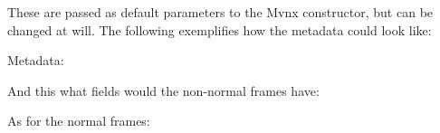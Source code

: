 \documentclass[letterpaper,10pt,english,openany,oneside]{sphinxmanual}
\begin{document}
\begin{sphinxVerbatim}[commandchars=\\\{\}]
  
\end{sphinxVerbatim}

These are passed as default parameters to the Mvnx constructor, but can be
changed at will. The following exemplifies how the metadata could look like:

Metadata:

\begin{sphinxVerbatim}[commandchars=\\\{\}]
     
\end{sphinxVerbatim}

And this what fields would the non-normal frames have:

\begin{sphinxVerbatim}[commandchars=\\\{\}]
\PYG{p}{[}     \PYG{p}{]}
\end{sphinxVerbatim}

As for the normal frames:
\end{document}
